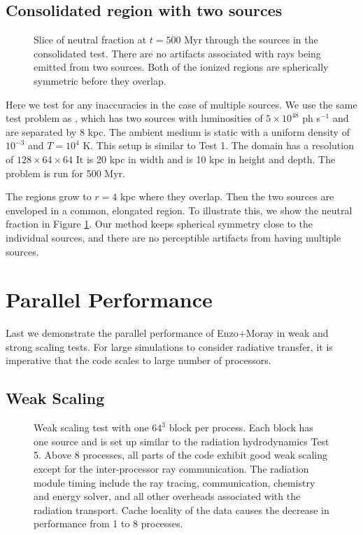 \documentclass[useAMS,usenatbib]{mn2e}
\begin{document}
\subsection{Consolidated \hii region with two sources}

\begin{figure}
  \caption{\label{fig:twosrc} Slice of neutral fraction at $t = 500$
    Myr through the sources in the consolidated \hii test.
    There are no artifacts associated with rays being emitted from two
    sources.  Both of the ionized regions are spherically symmetric
    before they overlap.}
\end{figure}

Here we test for any inaccuracies in the case of multiple sources.  We
use the same test problem as \citet[][\S5.1.2]{Petkova09}, which has
two sources with luminosities of $5 \times 10^{48}$ ph s$^{-1}$ and
are separated by 8 kpc.  The ambient medium is static with a uniform
density of $10^{-3}$ \cubecm and $T = 10^4$ K.  This setup is similar
to Test 1.  The domain has a resolution of $128 \times 64 \times 64$
It is 20 kpc in width and is 10 kpc in height and depth.  The problem
is run for 500 Myr.

The \hii regions grow to $r = 4$ kpc where they overlap.  Then
the two sources are enveloped in a common, elongated \hii
region.  To illustrate this, we show the neutral fraction in Figure
\ref{fig:twosrc}.  Our method keeps spherical symmetry close to the
individual sources, and there are no perceptible artifacts from having
multiple sources.

\section{Parallel Performance}

Last we demonstrate the parallel performance of Enzo+Moray in weak and
strong scaling tests.  For large simulations to consider radiative
transfer, it is imperative that the code scales to large number of
processors.

\subsection{Weak Scaling}
\label{sec:weak_sc}

\begin{figure}
  \caption{\label{fig:weak} Weak scaling test with one $64^3$ block
    per process.  Each block has one source and is set up similar to
    the radiation hydrodynamics Test 5.  Above 8 processes, all parts
    of the code exhibit good weak scaling except for the
    inter-processor ray communication.  The radiation module timing
    include the ray tracing, communication, chemistry and energy
    solver, and all other overheads associated with the radiation
    transport.  Cache locality of the data causes the decrease in
    performance from 1 to 8 processes.}
\end{figure}
\end{document}
